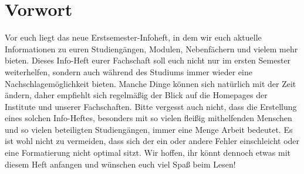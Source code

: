 \chapter{Vorwort}

Vor euch liegt das neue Erstsemester-Infoheft, in dem wir euch aktuelle Informationen zu euren Studiengängen, Modulen, Nebenfächern und vielem mehr bieten. Dieses Info-Heft eurer Fachschaft soll euch nicht nur im ersten Semester weiterhelfen, sondern auch während des Studiums immer wieder eine Nachschlagemöglichkeit bieten. Manche Dinge können sich natürlich mit der Zeit ändern, daher empfiehlt sich regelmäßig der Blick auf die Homepages der Institute und unserer Fachschaften. Bitte vergesst auch nicht, dass die Erstellung eines solchen Info-Heftes, besonders mit so vielen fleißig mithelfenden Menschen und so vielen beteiligten Studiengängen, immer eine Menge Arbeit bedeutet. Es ist wohl nicht zu vermeiden, dass sich der ein oder andere Fehler einschleicht oder eine Formatierung nicht optimal sitzt. Wir hoffen, ihr könnt dennoch etwas mit diesem Heft anfangen und wünschen euch viel Spaß beim Lesen!

